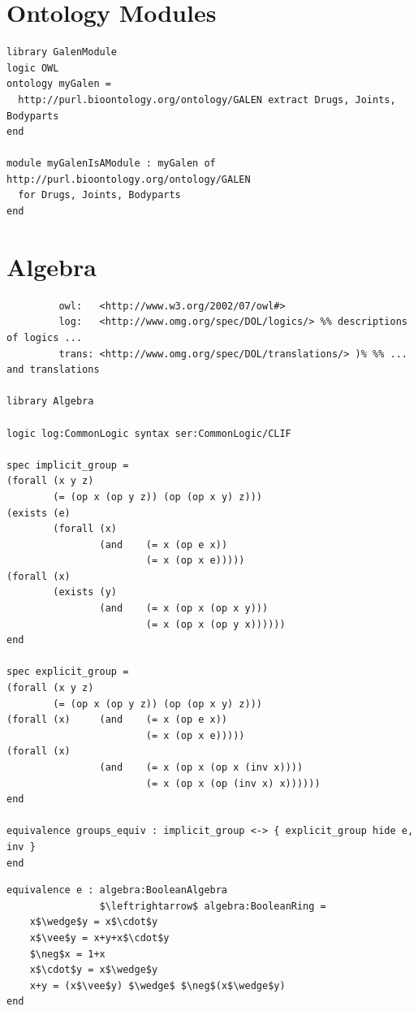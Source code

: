 \documentclass[10pt,fleqn,%
\ifpretendfinal
final%
\else
draft%
\fi,
]{scrreprt}
\newcommand{\sclause}[1]{\section{#1}}
\begin{document}
\sclause{Ontology Modules}

\begin{lstlisting}[basicstyle=\ttfamily,language=dolText,morekeywords={props,ObjectProperty,Class,DisjointUnionOf,SubClassOf,Characteristics,Transitive,Asymmetric,SubPropertyOf,DisjointClasses,EquivalentTo,inverse,only,forall,iff,if,or,exists,distributed,extract},escapechar=@,mathescape]
library GalenModule
logic OWL
ontology myGalen = 
  http://purl.bioontology.org/ontology/GALEN extract Drugs, Joints, Bodyparts
end

module myGalenIsAModule : myGalen of http://purl.bioontology.org/ontology/GALEN 
  for Drugs, Joints, Bodyparts
end
\end{lstlisting}

\sclause{Algebra}


\begin{lstlisting}[basicstyle=\ttfamily,language=dolText,morekeywords={props,ObjectProperty,Class,DisjointUnionOf,SubClassOf,Characteristics,Transitive,Asymmetric,SubPropertyOf,DisjointClasses,EquivalentTo,inverse,only,forall,iff,if,or,exists,distributed,equivalence},escapechar=@,mathescape]
%prefix( :     <http://www.example.org/alignment#>
         owl:   <http://www.w3.org/2002/07/owl#>
         log:   <http://www.omg.org/spec/DOL/logics/> %% descriptions of logics ...
         trans: <http://www.omg.org/spec/DOL/translations/> )% %% ... and translations

library Algebra

logic log:CommonLogic syntax ser:CommonLogic/CLIF

spec implicit_group =
(forall (x y z)
        (= (op x (op y z)) (op (op x y) z)))
(exists (e)
        (forall (x)
                (and    (= x (op e x))
                        (= x (op x e)))))
(forall (x)
        (exists (y)
                (and    (= x (op x (op x y)))
                        (= x (op x (op y x))))))
end

spec explicit_group =
(forall (x y z)
        (= (op x (op y z)) (op (op x y) z)))
(forall (x)     (and    (= x (op e x))
                        (= x (op x e)))))
(forall (x)
                (and    (= x (op x (op x (inv x))))
                        (= x (op x (op (inv x) x))))))
end

equivalence groups_equiv : implicit_group <-> { explicit_group hide e, inv }
end
\end{lstlisting}

\begin{lstlisting}[basicstyle=\ttfamily,language=dolText,morekeywords={props,ObjectProperty,Class,DisjointUnionOf,SubClassOf,Characteristics,Transitive,Asymmetric,SubPropertyOf,DisjointClasses,EquivalentTo,inverse,only,forall,iff,if,or,exists,sort,ops,in,approximate,extract,equivalence,spec},escapechar=@,mathescape]
equivalence e : algebra:BooleanAlgebra
                $\leftrightarrow$ algebra:BooleanRing =
    x$\wedge$y = x$\cdot$y
    x$\vee$y = x+y+x$\cdot$y
    $\neg$x = 1+x
    x$\cdot$y = x$\wedge$y
    x+y = (x$\vee$y) $\wedge$ $\neg$(x$\wedge$y)
end
\end{lstlisting}
\end{document}
